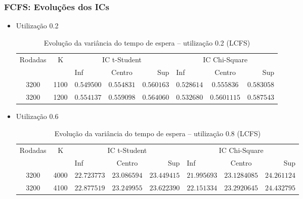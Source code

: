 \documentclass[a4paper]{article}
\begin{document}
\subsubsection{FCFS: Evoluções dos ICs}
\begin{itemize}
    \item Utilização 0.2
    \begin{table}[h!]
        \centering
        \begin{tabular}{|c|c|lcr|lcr|}\hline
            \multirow{2}{3.75em}{Rodadas}
                & \multirow{2}{1em}{K}
                & \multicolumn{3}{|c|}{IC t-Student}
                & \multicolumn{3}{|c|}{IC Chi-Square} \\
            && Inf & Centro & Sup & Inf & Centro & Sup \\\hline
            3200 & 1100
                &$ 0.549500 $&$ 0.554831 $&$ 0.560163 $
                &$ 0.528614 $&$ 0.555836 $&$ 0.583058 $\\\hline
            3200 & 1200
                &$ 0.554137 $&$ 0.559098 $&$ 0.564060 $
                &$ 0.532680 $&$ 0.5601115 $&$ 0.587543 $\\\hline
        \end{tabular}
        \caption{Evolução da variância do tempo de espera --
            utilização 0.2 (LCFS)}
    \end{table}
    \item Utilização 0.6
    \begin{table}[h!]
        \centering
        \begin{tabular}{|c|c|lcr|lcr|}\hline
            \multirow{2}{3.75em}{Rodadas}
                & \multirow{2}{1em}{K}
                & \multicolumn{3}{|c|}{IC t-Student}
                & \multicolumn{3}{|c|}{IC Chi-Square} \\
            && Inf & Centro & Sup & Inf & Centro & Sup \\\hline
            3200 & 4000
                &$ 22.723773 $&$ 23.086594 $&$ 23.449415 $
                &$ 21.995693 $&$ 23.1284085 $&$ 24.261124 $\\\hline
            3200 & 4100
                &$ 22.877519 $&$ 23.249955 $&$ 23.622390 $
                &$ 22.151334 $&$ 23.2920645 $&$ 24.432795 $\\\hline
        \end{tabular}
        \caption{Evolução da variância do tempo de espera --
            utilização 0.8 (LCFS)}
    \end{table}
\end{itemize}
\end{document}
